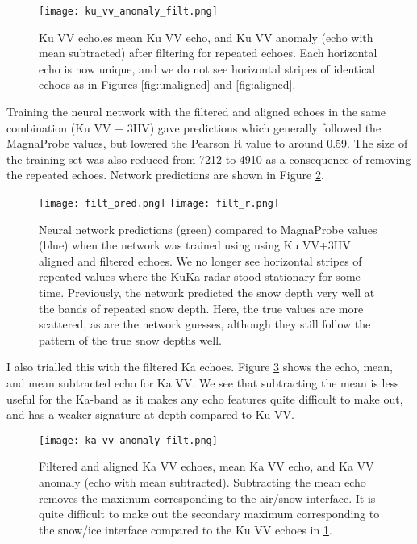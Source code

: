 \documentclass[11pt, a4paper]{article}
\begin{document}
\begin{figure}[H]
   		 \texttt{[image: ku\_vv\_anomaly\_filt.png]}
    		\caption{Ku VV echo,es mean Ku VV echo, and Ku VV anomaly (echo with mean subtracted) after filtering for repeated echoes. Each horizontal echo is now unique,  and we do not see horizontal stripes of identical echoes as in Figures  \ref{fig:unaligned} and \ref{fig:aligned}.}
	\label{fig:kufilt}
\end{figure}

Training the neural network with the filtered and aligned echoes in the same combination (Ku VV + 3HV) gave  predictions which generally followed the MagnaProbe values, but lowered the Pearson R value to around 0.59.   The size of the training set was also reduced from 7212 to 4910 as a consequence of removing the repeated echoes. Network predictions are shown in Figure \ref{fig:filtpred}. 

\begin{figure}[H]
\centering
   		 \texttt{[image: filt\_pred.png]}
   		 \texttt{[image: filt\_r.png]}
    		\caption{Neural network predictions (green) compared to MagnaProbe values (blue) when the network was trained using using Ku VV+3HV aligned and filtered echoes. We no longer see horizontal stripes of repeated values where the KuKa radar stood stationary for some time. Previously, the network predicted the snow depth very well at the bands of repeated snow depth.  Here, the true values are more scattered, as are the network guesses, although they still follow the pattern of the true snow depths well.}
	\label{fig:filtpred}
\end{figure}
\pagebreak
I also trialled this with the filtered Ka echoes.  Figure \ref{fig:kafilt} shows the echo, mean, and mean subtracted echo for Ka VV. We see that subtracting the mean is less useful for the Ka-band as it makes any echo features quite difficult to make out, and has a weaker signature at depth compared to Ku VV.

\begin{figure}[H]
   		 \texttt{[image: ka\_vv\_anomaly\_filt.png]}
    		\caption{Filtered and aligned Ka VV echoes, mean Ka VV echo,  and Ka VV anomaly (echo with mean subtracted). Subtracting the mean echo removes the maximum corresponding to the air/snow interface. It is quite difficult to make out the secondary maximum corresponding to the snow/ice interface compared to the Ku VV echoes in \ref{fig:kufilt}.}
	\label{fig:kafilt}
\end{figure}
\end{document}
